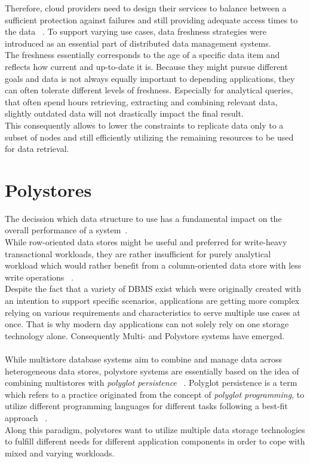 Therefore, cloud providers need to design their services 
to balance between a sufficient protection against failures and still providing adequate access times to the data ~\cite{cap2002, levandowski2013}.
To support varying use cases, data freshness strategies were introduced as an essential part of distributed data management systems.\\
The freshness essentially corresponds to the age of a specific data item and reflects how current and up-to-date it is.
Because they might pursue different goals and data is not always equally important to depending applications, they can often tolerate different levels of freshness.
Especially for analytical queries, that often spend hours retrieving, extracting and combining relevant data, slightly outdated data will not drastically 
impact the final result.\\
This consequently allows to lower the constraints to replicate data only to a subset of nodes and still efficiently 
utilizing the remaining resources to be used for data retrieval.




\section{Polystores}

The decission which data structure to use has a fundamental impact on the overall performance of a system~\cite{plattner2015}.\\
While row-oriented data stores might be useful and preferred for write-heavy transactional 
workloads, they are rather insufficient for purely analytical workload which would rather benefit from a
column-oriented data store with less write operations ~\cite{sigmond2008}.\\

Despite the fact that a variety of DBMS exist which were originally created with an intention to support specific scenarios,
applications are getting more complex relying on various requirements and characteristics to serve multiple use cases at once.
That is why modern day applications can not solely rely on one storage technology alone. 
Consequently Multi- and Polystore systems have emerged. \\
\\
While multistore database systems aim to combine and manage data across heterogeneous data stores,
polystore systems are essentially based on the idea of combining multistores with
\textit{polyglot persistence} ~\cite{polypheny2020}.
Polyglot persistence is a term which refers to a practice originated from the concept 
of \textit{polyglot programming}, to utilize different 
programming languages for different tasks following a best-fit approach ~\cite{fowler2011}. \\
Along this paradigm, polystores want to utilize multiple data storage technologies to
fulfill different needs for different application components in order to cope
with mixed and varying workloads.

